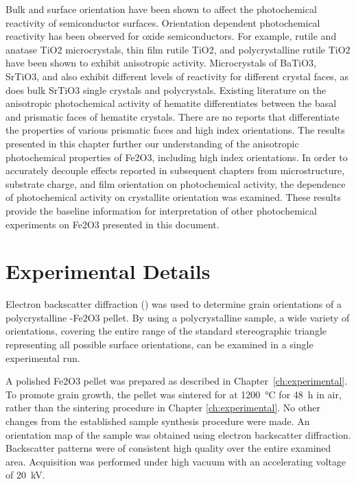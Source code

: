 \documentclass[12pt,%
              twoside,
               letterpaper]{uiothesis}
\begin{document}
Bulk and surface orientation have been shown to affect the photochemical
reactivity of semiconductor surfaces. Orientation dependent photochemical reactivity has
been observed for oxide semiconductors. For example, rutile and anatase TiO2
microcrystals,\cite{Ohno:2002fn} thin film rutile TiO2,\cite{Anonymous:YQSV8dnc} and
polycrystalline rutile TiO2\cite{Lowekamp:1998ks} have been shown to exhibit
anisotropic activity. Microcrystals of BaTiO3,\cite{Giocondi:2008ja}
SrTiO3,\cite{Giocondi:2007fa} and \cite{Giocondi:2008ja} also exhibit
different levels of reactivity for different crystal faces, as does bulk SrTiO3
single crystals\cite{Giocondi:2003wc} and polycrystals.\cite{Giocondi:2003wn} Existing
literature on the anisotropic photochemical activity of hematite differentiates between
the basal and prismatic faces of hematite crystals.\cite{Eggleston:2009ic} There are no
reports that differentiate the properties of various prismatic faces and high index
orientations. The results presented in this chapter further our understanding of the
anisotropic photochemical properties of Fe2O3, including high index orientations.
In order to accurately decouple effects reported in subsequent chapters from
microstructure, substrate charge, and film orientation on photochemical activity, the
dependence of photochemical activity on crystallite orientation was examined.  These
results provide the baseline information for interpretation of other photochemical
experiments on Fe2O3 presented in this document.



\section{Experimental Details}
\label{sec:ch9experimental}


Electron backscatter diffraction () was used to determine grain orientations of
a polycrystalline \textalpha-Fe2O3 pellet. By using a polycrystalline sample, a wide
variety of orientations, covering the entire range of the standard stereographic triangle
representing all possible surface orientations, can be examined in a single experimental
run. 

A polished Fe2O3 pellet was prepared as described in Chapter~\ref{ch:experimental}.
To promote grain growth, the pellet was sintered for at \SI{1200}{\degreeCelsius} for
\SI{48}{\hour} in air, rather than the sintering procedure in Chapter
\ref{ch:experimental}. No other changes from the established sample synthesis procedure
were made. An orientation map of the sample was obtained using electron backscatter
diffraction. Backscatter patterns were of consistent high quality over the entire examined
area. Acquisition was performed under high vacuum with an accelerating voltage of
\SI{20}{\kilo\volt}. 
\end{document}
